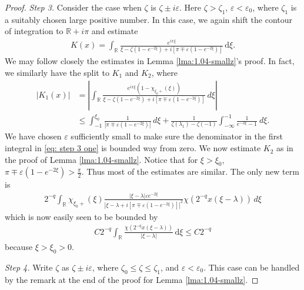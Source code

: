\documentclass[GreensFunctions.tex]{subfiles}
\begin{document}
\begin{proof}
	{\em Step 3.} 
	Consider the case when $\zeta$ is $\zeta \pm i\varepsilon$. Here $\zeta>\zeta_1$, 
	$\varepsilon<\varepsilon_0$, where $\zeta_1$ is a suitably chosen large positive 
	number. In this case, we again shift the contour of integration to ${\mathbb R}+i\pi$ 
	and estimate
	\begin{align*}
		K(x) 
			= 
				\int_{\mathbb R} 
					\frac{e^{ix\xi}}
						{\xi-\zeta(1-e^{-2\xi})+i[\pi \mp \varepsilon(1-e^{-2\xi})]}
				\, \mathrm{d}\xi.	
	\end{align*}
	We may follow closely the estimates in Lemma \ref{lma:1.04-smallz}'s proof. In fact, 
	we similarly have the split to $K_1$ and $K_2$, where
	\begin{align}
		|K_1(x)| 
			&= 
				\left|
					\int_{\mathbb R} 
						\frac{e^{ix\xi}(1-\chi_{\xi_0+}(\xi))}
							{\xi-\zeta(1-e^{-2\xi})+i[\pi \mp \varepsilon(1-e^{-2\xi})]}
					\,d\xi
				\right|
				\\
			&\le 
				\int_{-1}^{\xi_0} 
					\frac{1}{|\pi\mp \varepsilon(1-e^{-2\xi})|}
				\,d\xi 
				+ \frac{1}{\zeta(\lambda_1)-\zeta(-1)}
				\int_{-\infty}^{-1} \frac{1}{e^{-2\xi}-1}~d\xi.\label{eq: step 3 one}
	\end{align}
	We have chosen $\varepsilon$ sufficiently small to make sure the denominator in 
	the first integral in \eqref{eq: step 3 one} is bounded way from zero. We now 
	estimate $K_2$ as in the proof of Lemma \ref{lma:1.04-smallz}. Notice that for 
	$\xi>\xi_0$, $\pi \mp \varepsilon(1-e^{-2\xi})>\frac\pi 2$. Thus most of the 
	estimates are similar. The only new term is
	\begin{align*}
		2^{-q} 
		\int_{\mathbb R} 
			\chi_{\xi_0+}(\xi)
			\frac{|\xi-\lambda|\varepsilon e^{-2\xi}}
				{
					\left|\xi-\lambda+i[\pi\mp\varepsilon(1-e^{-2\xi})]\right|^2
				}
				\chi(2^{-q}x(\xi-\lambda))
		\,d\xi
	\end{align*}
	which is now easily seen to be bounded by 
	\begin{align*}
		C2^{-q}
			\int_{\mathbb R} 
				\frac{\chi(2^{-q}x(\xi-\lambda))}{|\xi-\lambda|}
			\, \mathrm{d}\xi
		\le C2^{-q}
	\end{align*}
	because $\xi>\xi_0>0$.

	{\em Step 4.} 
	Write $\zeta$ as $\zeta\pm i\varepsilon$, where $\zeta_0\le \zeta\le \zeta_1$, and 
	$\varepsilon<\varepsilon_0$. This case can be handled by the remark at the end of 
	the proof for Lemma \ref{lma:1.04-smallz}.


\end{proof}
\end{document}
